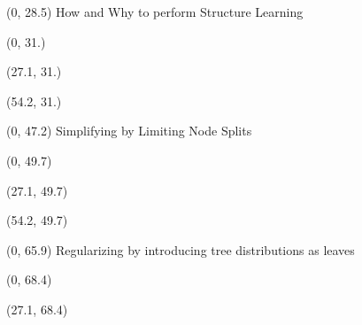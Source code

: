 \documentclass[final]{beamer}
\begin{document}
\begin{frame}{}
\begin{textblock}{25.7}
  \end{textblock}
  
  \begin{textblock}{80}(0, 28.5)
    How and Why to perform Structure Learning
    
  \end{textblock}
  
  \begin{textblock}{25.7}(0, 31.)
    \small
    \blindtext
  \end{textblock}
  
  \begin{textblock}{25.7}(27.1, 31.)
    \small
    \blindtext
  \end{textblock}
  
  \begin{textblock}{25.7}(54.2, 31.)
    \small
    \blindtext
  \end{textblock}
  
  
  \begin{textblock}{80}(0, 47.2)
    Simplifying by Limiting Node Splits
  \end{textblock}
  
  \begin{textblock}{25.7}(0, 49.7)
    \small
    \blindtext
  \end{textblock}
  
  \begin{textblock}{25.7}(27.1, 49.7)
    \small
    \blindtext
  \end{textblock}
  
  \begin{textblock}{25.7}(54.2, 49.7)
    \small
    \blindtext
  \end{textblock}
  
  
  \begin{textblock}{80}(0, 65.9)
    Regularizing by introducing tree distributions as leaves
  \end{textblock}
  
  \begin{textblock}{25.7}(0, 68.4)
    \small
    \blindtext
  \end{textblock}
  
  \begin{textblock}{25.7}(27.1, 68.4)
    \small
    \blindtext
  \end{textblock}
  

\end{frame}
\end{document}
